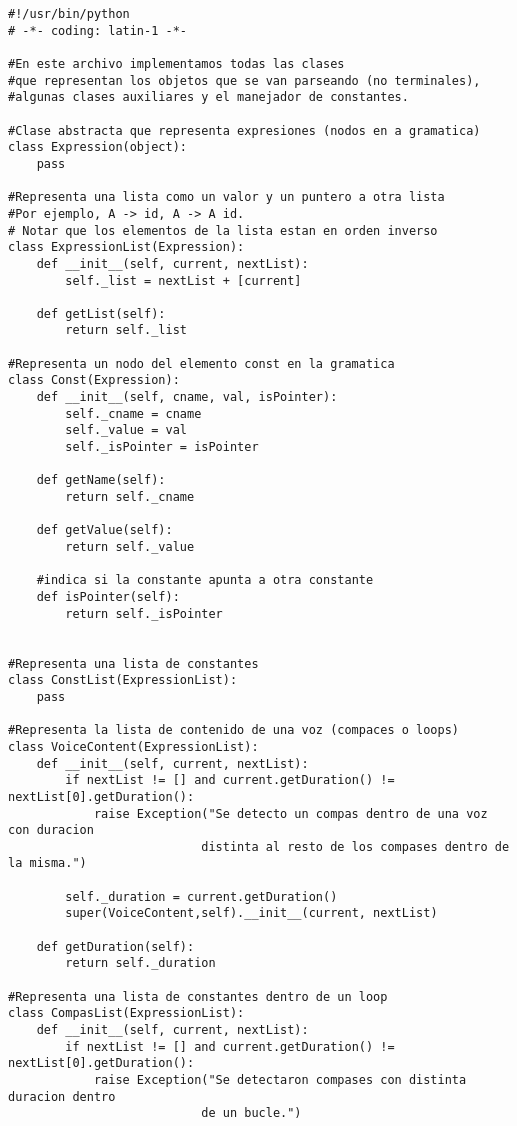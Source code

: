 \begin{verbatim}
#!/usr/bin/python
# -*- coding: latin-1 -*-

#En este archivo implementamos todas las clases 
#que representan los objetos que se van parseando (no terminales),
#algunas clases auxiliares y el manejador de constantes.

#Clase abstracta que representa expresiones (nodos en a gramatica)
class Expression(object):
    pass

#Representa una lista como un valor y un puntero a otra lista
#Por ejemplo, A -> id, A -> A id.
# Notar que los elementos de la lista estan en orden inverso
class ExpressionList(Expression):
    def __init__(self, current, nextList):
        self._list = nextList + [current]

    def getList(self):
        return self._list

#Representa un nodo del elemento const en la gramatica
class Const(Expression):
    def __init__(self, cname, val, isPointer):
        self._cname = cname
        self._value = val
        self._isPointer = isPointer

    def getName(self):
        return self._cname

    def getValue(self):
        return self._value

    #indica si la constante apunta a otra constante
    def isPointer(self):
        return self._isPointer


#Representa una lista de constantes
class ConstList(ExpressionList):
    pass

#Representa la lista de contenido de una voz (compaces o loops)
class VoiceContent(ExpressionList):
    def __init__(self, current, nextList):
        if nextList != [] and current.getDuration() != nextList[0].getDuration():
            raise Exception("Se detecto un compas dentro de una voz con duracion
           	               distinta al resto de los compases dentro de la misma.")

        self._duration = current.getDuration()
        super(VoiceContent,self).__init__(current, nextList)

    def getDuration(self):
        return self._duration

#Representa una lista de constantes dentro de un loop
class CompasList(ExpressionList):
    def __init__(self, current, nextList):
        if nextList != [] and current.getDuration() != nextList[0].getDuration():
            raise Exception("Se detectaron compases con distinta duracion dentro 
                           de un bucle.")


\end{verbatim}
